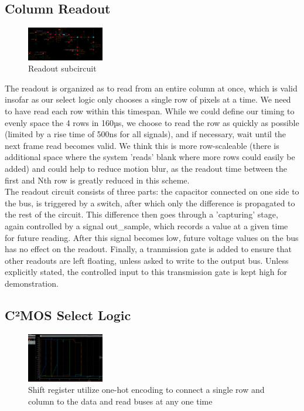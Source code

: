 \documentclass[lettersize,journal]{IEEEtran}
\begin{document}
\subsection{Column Readout}
\begin{figure}[h]
	\centering
	\includegraphics[width =0.3\textwidth]{readoutschem.png}
	\caption{Readout subcircuit}
	\label{readoutschem}
\end{figure}

The readout is organized as to read from an entire column at once, which is valid insofar as our select logic only chooses a single row of pixels at a time.
We need to have read each row within this timespan. While we could define our timing to evenly space the 4 rows in 160µs, we choose to read the row as quickly as possible (limited by a rise time of 500ns for all signals), and if necessary, wait until the next frame read becomes valid. 
We think this is more row-scaleable (there is additional space where the system 'reads' blank where more rows could easily be added) and could help to reduce motion blur, as the readout time between the first and Nth row is greatly reduced in this scheme.\\

The readout circuit consists of three parts: the capacitor connected on one side to the bus, is triggered by a switch, after which only the difference is propagated to the rest of the circuit. This difference then goes through a 'capturing' stage, again controlled by a signal out\_sample, which records a value at a given time for future reading. After this signal becomes low, future voltage values on the bus has no effect on the readout.
Finally, a tranmission gate is added to ensure that other readouts are left floating, unless asked to write to the output bus. Unless explicitly stated, the controlled input to this transmission gate is kept high for demonstration.
\subsection{C²MOS Select Logic}
\begin{figure}[h]
	\centering
	\includegraphics[width =0.3\textwidth]{shiftregisterpass.png}
	\caption{Shift register utilize one-hot encoding to connect a single row and column to the data and read buses  at any one time}
	\label{}
\end{figure}
\end{document}
